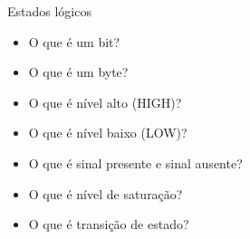 

\begin{frame}{Estados lógicos}
    \begin{itemize}
        \item O que é um bit? 
        \item O que é um byte?
        \item O que é nível alto (HIGH)?
        \item O que é nível baixo (LOW)?
        \item O que é sinal presente e sinal ausente?
        \item O que é nível de saturação?
        \item O que é transição de estado?
    \end{itemize}
\end{frame}